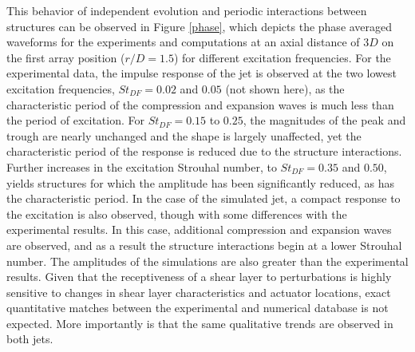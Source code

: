 \documentclass[english]{aiaa-tc}
\begin{document}
This behavior of independent evolution and periodic interactions between structures can be observed in Figure \ref{phase}, which depicts the phase averaged waveforms for the experiments and computations at an axial distance of $3D$ on the first array position ($r/D=1.5$) for different excitation frequencies. For the experimental data, the impulse response of the jet is observed at the two lowest excitation frequencies, $St_{DF} = 0.02$ and $0.05$ (not shown here), as the characteristic period of the compression and expansion waves is much less than the period of excitation. For $St_{DF} = 0.15$ to $0.25$, the magnitudes of the peak and trough are nearly unchanged and the shape is largely unaffected, yet the characteristic period of the response is reduced due to the structure interactions. Further increases in the excitation Strouhal number, to $St_{DF} = 0.35$ and $0.50$, yields structures for which the amplitude has been significantly reduced, as has the characteristic period. In the case of the simulated jet, a compact response to the excitation is also observed, though with some differences with the experimental results. In this case, additional compression and expansion waves are observed, and as a result the structure interactions begin at a lower Strouhal number. The amplitudes of the simulations are also greater than the experimental results. Given that the receptiveness of a shear layer to perturbations is highly sensitive to changes in shear layer characteristics and actuator locations, exact quantitative matches between the experimental and numerical database is not expected. More importantly is that the same qualitative trends are observed in both jets. 
\end{document}
